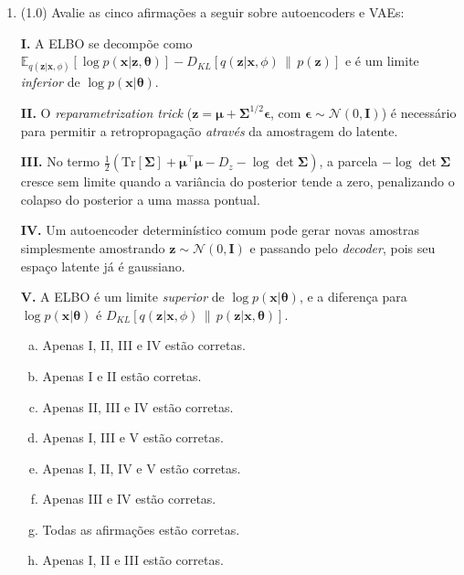 \documentclass[11pt,a4paper]{article}
\newcommand{\thetav}{\boldsymbol{\theta}}
\begin{document}
\begin{enumerate}[1)]
\begin{enumerate}[a)]
    \item $3.25$
    \item $2.25$
    \item $4.50$
    \item $0.25$
    \item $1.50$
    \item $4.25$
    \item $2.00$
    \item $5.00$
\end{enumerate}

\item (1.0) Avalie as cinco afirmações a seguir sobre autoencoders e VAEs:

\textbf{I.} A ELBO se decompõe como $\mathbb{E}_{q(\mathbf{z}|\mathbf{x},\phi)}[\log p(\mathbf{x}|\mathbf{z},\thetav)] - D_{KL}[q(\mathbf{z}|\mathbf{x},\phi)\,\|\,p(\mathbf{z})]$ e é um limite \emph{inferior} de $\log p(\mathbf{x}|\thetav)$.

\textbf{II.} O \textit{reparametrization trick} ($\mathbf{z} = \boldsymbol{\mu} + \boldsymbol{\Sigma}^{1/2}\boldsymbol{\epsilon}$, com $\boldsymbol{\epsilon} \sim \mathcal{N}(0,\mathbf{I})$) é necessário para permitir a retropropagação \emph{através} da amostragem do latente.

\textbf{III.} No termo $\tfrac{1}{2}(\mathrm{Tr}[\boldsymbol{\Sigma}] + \boldsymbol{\mu}^{\top}\boldsymbol{\mu} - D_z - \log\det\boldsymbol{\Sigma})$, a parcela $-\log\det\boldsymbol{\Sigma}$ cresce sem limite quando a variância do posterior tende a zero, penalizando o colapso do posterior a uma massa pontual.

\textbf{IV.} Um autoencoder determinístico comum pode gerar novas amostras simplesmente amostrando $\mathbf{z} \sim \mathcal{N}(0,\mathbf{I})$ e passando pelo \textit{decoder}, pois seu espaço latente já é gaussiano.

\textbf{V.} A ELBO é um limite \emph{superior} de $\log p(\mathbf{x}|\thetav)$, e a diferença para $\log p(\mathbf{x}|\thetav)$ é $D_{KL}[q(\mathbf{z}|\mathbf{x},\phi)\,\|\,p(\mathbf{z}|\mathbf{x},\thetav)]$.

\begin{enumerate}[a)]
    \item Apenas I, II, III e IV estão corretas.
    \item Apenas I e II estão corretas.
    \item Apenas II, III e IV estão corretas.
    \item Apenas I, III e V estão corretas.
    \item Apenas I, II, IV e V estão corretas.
    \item Apenas III e IV estão corretas.
    \item Todas as afirmações estão corretas.
    \item Apenas I, II e III estão corretas.
\end{enumerate}


\end{enumerate}
\end{document}
